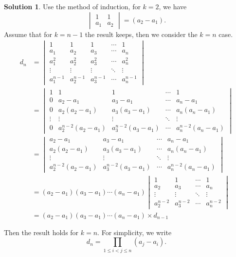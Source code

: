 \documentclass{article}
\theoremstyle{definition}
\newtheorem{solution}{Solution}[exercise]
\begin{document}
\begin{solution}
Use the method of induction, for $k=2$, we have
$$
\begin{vmatrix}
    1 & 1 \\
    a_{1} & a_{2}
\end{vmatrix}
=(a_{2}-a_{1}).$$
Assume that for $k=n-1$ the result keeps, then we
consider the $k=n$ case.
\begin{align*}
d_{n} 
& =
\begin{vmatrix}
    1 & 1 & 1 & \cdots & 1 \\
    a_{1} & a_{2} & a_{3} & \cdots & a_{n} \\
    a_{1}^{2} & a_{2}^{2} & a_{3}^{2} & \cdots & a_{n}^{2} \\
    \vdots & \vdots & \vdots & \ddots & \vdots \\
    a_{1}^{n-1} & a_{2}^{n-1} & a_{3}^{n-1} & \cdots & a_{n}^{n-1}
\end{vmatrix}\\
& =
\begin{vmatrix}
    1 & 1 & 1 & \cdots & 1 \\
    0 & a_{2}-a_{1} & a_{3}-a_{1} & \cdots & a_{n}-a_{1} \\
    0 & a_{2}(a_{2}-a_{1}) & a_{3}(a_{3}-a_{1}) & \cdots & a_{n}(a_{n}-a_{1}) \\
    \vdots & \vdots & \vdots & \ddots & \vdots \\
    0 & a_{2}^{n-2}(a_{2}-a_{1}) & a_{3}^{n-2}(a_{3}-a_{1}) & \cdots & a_{n}^{n-2}(a_{n}-a_{1})
\end{vmatrix}\\
& =
\begin{vmatrix}
    a_{2}-a_{1} & a_{3}-a_{1} & \cdots & a_{n}-a_{1} \\
    a_{2}(a_{2}-a_{1}) & a_{3}(a_{3}-a_{1}) & \cdots & a_{n}(a_{n}-a_{1}) \\
    \vdots & \vdots & \ddots & \vdots \\
    a_{2}^{n-2}(a_{2}-a_{1}) & a_{3}^{n-2}(a_{3}-a_{1}) & \cdots & a_{n}^{n-2}(a_{n}-a_{1})
\end{vmatrix}\\
& =
(a_{2}-a_{1})(a_{3}-a_{1})\cdots(a_{n}-a_{1})
\begin{vmatrix}
    1 & 1 & \cdots & 1 \\
    a_{2} & a_{3} & \cdots & a_{n} \\
    \vdots & \vdots & \ddots & \vdots \\
    a_{2}^{n-2} & a_{3}^{n-2} & \cdots & a_{n}^{n-2}
\end{vmatrix}\\
& =
(a_{2}-a_{1})(a_{3}-a_{1})\cdots(a_{n}-a_{1})\times d_{n-1}
\end{align*}

Then the result holds for $k=n$. For simplicity, we write 
$$d_{n}=\prod_{1\leq i<j\leq n}(a_{j}-a_{i}).$$
\end{solution}
\end{document}
